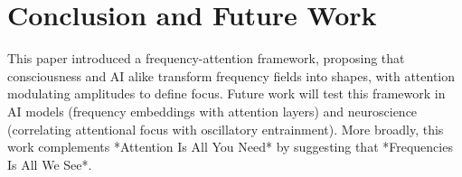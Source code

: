 \documentclass[12pt]{article}
\begin{document}
\section{Conclusion and Future Work}
This paper introduced a frequency-attention framework, proposing that consciousness and AI alike transform frequency fields into shapes, with attention modulating amplitudes to define focus. Future work will test this framework in AI models (frequency embeddings with attention layers) and neuroscience (correlating attentional focus with oscillatory entrainment). More broadly, this work complements *Attention Is All You Need* by suggesting that *Frequencies Is All We See*.



\end{document}
